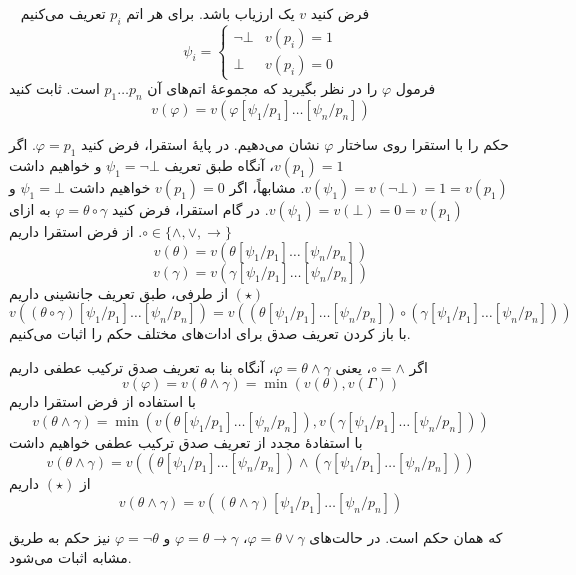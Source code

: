 ~
فرض کنید $v$ یک ارزیاب باشد. برای هر اتم $p_i$ تعریف می‌کنیم
\[ \psi_i =
\begin{cases}
  \neg \bot & v(p_i) = 1\\
  \bot & v(p_i) = 0
\end{cases}
\]
فرمول $\varphi$ را در نظر بگیرید که مجموعهٔ اتم‌های آن $p_1 \dots p_n$ است. ثابت کنید
\[ v(\varphi) = v(\varphi[\psi_1/p_1]\dots[\psi_n/p_n]) \]
\begin{ans}
  حکم را با استقرا روی ساختار $\varphi$ نشان می‌دهیم. در پایهٔ استقرا، فرض کنید $\varphi = p_1$. اگر $v(p_1) = 1$، آنگاه طبق تعریف $\psi_1 = \neg \bot$ و خواهیم داشت $v(\psi_1) = v(\neg \bot) = 1 = v(p_1)$. مشابهاً، اگر $v(p_1) = 0$ خواهیم داشت $\psi_1 = \bot$ و $v(\psi_1) = v(\bot) = 0 = v(p_1)$. در گام استقرا، فرض کنید $\varphi = \theta \circ \gamma$ به ازای $\circ \in \{\wedge, \vee, \rightarrow\}$. از فرض استقرا داریم
  \[ v(\theta) = v(\theta[\psi_1/p_1]\dots[\psi_n/p_n]) \]
  \[ v(\gamma) = v(\gamma[\psi_1/p_1]\dots[\psi_n/p_n]) \]
  از طرفی، طبق تعریف جانشینی داریم $(\star)$
  \[ v((\theta \circ \gamma)[\psi_1/p_1]\dots[\psi_n/p_n]) = v((\theta[\psi_1/p_1]\dots[\psi_n/p_n]) \circ (\gamma[\psi_1/p_1]\dots[\psi_n/p_n])) \]
  با باز کردن تعریف صدق برای ادات‌های مختلف حکم را اثبات می‌کنیم.
  
  اگر $\circ = \wedge$، یعنی $\varphi = \theta \wedge \gamma$، آنگاه بنا به تعریف صدق ترکیب عطفی داریم
  \[ v(\varphi) = v(\theta \wedge \gamma) = \min(v(\theta), v(\Gamma)) \]
  با استفاده از فرض استقرا داریم
  \[ v(\theta \wedge \gamma) = \min(v(\theta[\psi_1/p_1]\dots[\psi_n/p_n]), v(\gamma[\psi_1/p_1]\dots[\psi_n/p_n])) \]
  با استفادهٔ مجدد از تعریف صدق ترکیب عطفی خواهیم داشت
  \[ v(\theta \wedge \gamma) = v((\theta[\psi_1/p_1]\dots[\psi_n/p_n]) \wedge (\gamma[\psi_1/p_1]\dots[\psi_n/p_n])) \]
  از $(\star)$ داریم
  \[ v(\theta \wedge \gamma) = v((\theta \wedge \gamma)[\psi_1/p_1]\dots[\psi_n/p_n]) \]

  که همان حکم است. در حالت‌های $\varphi = \theta \vee \gamma$، $\varphi = \theta \rightarrow \gamma$ و $\varphi = \neg \theta$ نیز حکم به طریق مشابه اثبات می‌شود.
\end{ans}